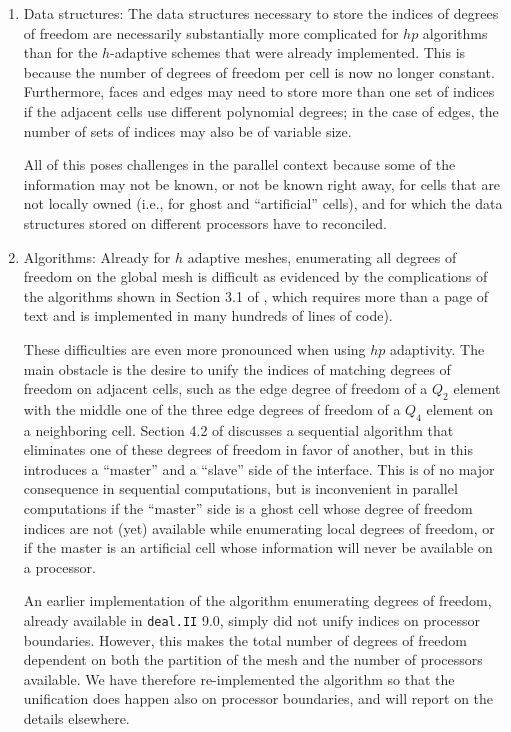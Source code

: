 \documentclass{ansarticle-preprint}
\newcommand{\specialword}[1]{\texttt{#1}}
\newcommand{\dealii}{{\specialword{deal.II}}\xspace}
\begin{document}
\begin{enumerate}
\item Data structures: The data structures necessary to store the
  indices of degrees of freedom are necessarily substantially more
  complicated for $hp$ algorithms than for the $h$-adaptive schemes
  that were already implemented. This is because the number of degrees
  of freedom per cell is now no longer constant. Furthermore,
  faces and edges may need to store more than one set of indices if
  the adjacent cells use different polynomial degrees; in the case of
  edges, the number of sets of indices may also be of variable size.

  All of this poses challenges in the parallel context because some of
  the information may not be known, or not be known right away, for
  cells that are not locally owned (i.e., for ghost and ``artificial''
  cells), and for which the data structures stored on different
  processors have to reconciled.

\item Algorithms: Already for $h$ adaptive meshes, enumerating all
  degrees of freedom on the global mesh is difficult as evidenced by
  the complications of the algorithms shown in Section 3.1 of
  \cite{BangerthBursteddeHeisterKronbichler11}, which requires more
  than a page of text and is implemented in many hundreds of lines of
  code).

  These difficulties are even more pronounced when using $hp$
  adaptivity. The main obstacle is the desire to unify the indices of
  matching degrees of freedom on adjacent cells, such as the edge
  degree of freedom of a $Q_2$ element with the middle one of
  the three edge degrees of freedom of a $Q_4$ element on a
  neighboring cell. Section 4.2 of
  \cite{BangerthKayserHerold2007} discusses a sequential algorithm
  that eliminates one of these degrees of freedom in favor of another,
  but in this introduces a ``master'' and a ``slave'' side of the
  interface. This is of no major consequence in sequential
  computations, but is inconvenient in parallel computations if the
  ``master'' side is a ghost cell whose degree of freedom indices are
  not (yet) available while enumerating local degrees of freedom, or
  if the master is an artificial cell whose information will never be
  available on a processor.

  An earlier implementation of the algorithm enumerating degrees of
  freedom, already available in \dealii{} 9.0, simply did not unify
  indices on processor boundaries. However, this makes the total
  number of degrees of freedom dependent on both the partition of the
  mesh and the number of processors available. We have therefore
  re-implemented the algorithm so that the unification does happen
  also on processor boundaries, and will report on the details
  elsewhere.


\end{enumerate}
\end{document}
